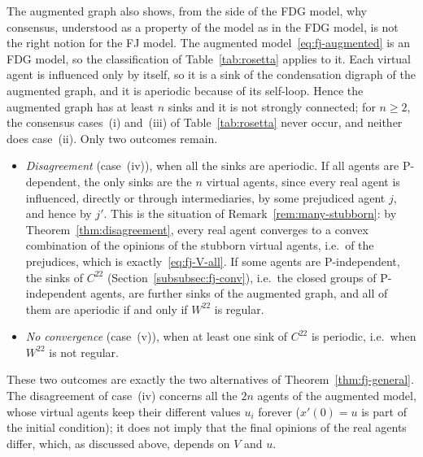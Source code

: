 The augmented graph also shows, from the side of the FDG model, why consensus,
understood as a property of the model as in the FDG model, is not the right notion for
the FJ model.
 The augmented
model~\eqref{eq:fj-augmented} is an FDG model, so the classification of
Table~\ref{tab:rosetta} applies to it. Each virtual agent is influenced only by
itself, so it is a sink of the condensation digraph of the augmented graph, and it is
aperiodic because of its self-loop. Hence the augmented graph has at least $n$ sinks
and it is not strongly connected; for $n \geq 2$, the consensus cases~(i) and~(iii) of
Table~\ref{tab:rosetta} never occur, and neither does case~(ii). Only two outcomes
remain.
\begin{itemize}
  \item \emph{Disagreement} (case~(iv)), when all the sinks are aperiodic. If all
        agents are P-dependent, the only sinks are the $n$ virtual agents, since every
        real agent is influenced, directly or through intermediaries, by some
        prejudiced agent $j$, and hence by $j'$. This is the situation of
        Remark~\ref{rem:many-stubborn}: by Theorem~\ref{thm:disagreement}, every real
        agent converges to a convex combination of the opinions of the stubborn
        virtual agents, i.e.\ of the prejudices, which is
        exactly~\eqref{eq:fj-V-all}. If some agents are P-independent, the sinks of
        $C^{22}$ (Section~\ref{subsubsec:fj-conv}), i.e.\ the closed groups of
        P-independent agents, are further sinks of the augmented graph, and all of them are
        aperiodic if and only if $W^{22}$ is regular.
  \item \emph{No convergence} (case~(v)), when at least one sink of $C^{22}$ is
        periodic, i.e.\ when $W^{22}$ is not regular.
\end{itemize}
These two outcomes are exactly the two alternatives of
Theorem~\ref{thm:fj-general}. The disagreement of case~(iv) concerns all the $2n$ agents
of the augmented model, whose virtual agents keep their different values $u_i$ forever
($x'(0) = u$ is part of the initial condition); it does not imply that the final
opinions of the real agents differ, which, as discussed above, depends on $V$ and $u$.

